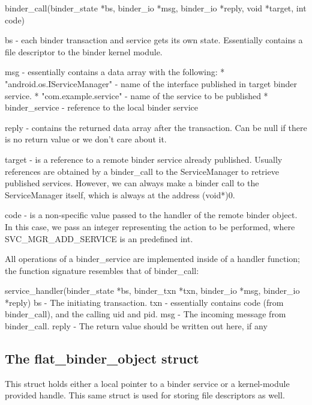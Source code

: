 \documentclass[prodmode]{acmlarge}
\begin{document}
\begin{snippet}
binder_call(binder_state *bs, binder_io *msg, binder_io *reply, void *target, int code)

bs -     each binder transaction and service gets its own state.
         Essentially contains a file descriptor to the binder kernel module.

msg -    essentially contains a data array with the following:
         * "android.os.IServiceManager" - name of the interface published in
                                          target binder service.
          * "com.example.service"       - name of the service to be  published
          * binder_service              - reference to the local binder
                                          service

reply -   contains the returned data array after the transaction. Can be null
          if there is no return value or we don't care about it.

target -  is a reference to a remote binder service already published. Usually
          references are obtained by a binder_call to the ServiceManager to retrieve
          published services. However, we can always make a binder call to the
          ServiceManager itself, which is always at the address (void*)0.

code -    is a non-specific value passed to the handler of the remote binder object.
          In this case, we pass an integer representing the action to be performed,
          where SVC_MGR_ADD_SERVICE is an predefined int.
\end{snippet}

All operations of a binder\_service are implemented inside of a handler function; the function signature resembles that of binder\_call:

\begin{snippet}
service_handler(binder_state *bs, binder_txn *txn,  binder_io *msg, binder_io *reply)
bs -      The initiating transaction.
txn -     essentially contains code (from binder_call), and the calling uid and pid.
msg -     The incoming message from binder_call.
reply -   The return value should be written out here, if any
\end{snippet}

\subsection{The flat\_binder\_object struct}
This struct holds either a local pointer to a binder service or a kernel-module provided handle. This same struct is used for storing file descriptors as well.
\end{document}
